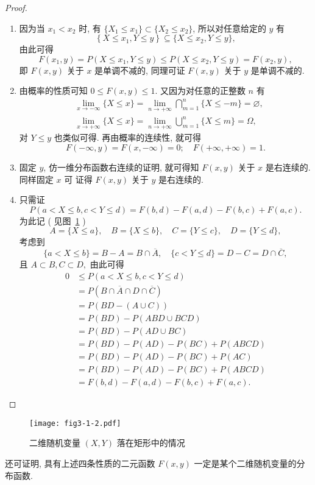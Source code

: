   \begin{proof}
    	\begin{enumerate}
    		\item  因为当 $x_1<x_2$ 时, 有 $\{X_1\leq x_1\} \subset \{X_2 \leq x_2\}$, 所以对任意给定的 $y$ 有
    		\[
    			\left\{X \leq x_{1}, Y \leq y\right\} \subseteq \{ X \leq x_{2}, Y \leq y \},
    		\]
    		由此可得
    		\[
    			F\left(x_{1}, y\right)=P\left(X \leq x_{1}, Y \leq y\right) \leq 
    			P\left(X \leq x_{2}, Y \leq y\right)=F\left(x_{2}, y\right),
    		\]
    		即 $F(x,y)$ 关于 $x$ 是单调不减的, 同理可证 $F(x,y)$ 关于 $y$ 是单调不减的.
    		\item 由概率的性质可知 $0\leq F(x,y) \leq 1$. 又因为对任意的正整数 $n$ 有
    		\begin{align*}
    			&\lim_{x\to -\infty}\{X\leq x\}=\lim_{n\to +\infty}\bigcap_{m=1}^n \{X\leq -m\}=\varnothing,	\\
    			&\lim_{x\to +\infty}\{X\leq x\}=\lim_{n\to +\infty}\bigcup_{m=1}^n\{X\leq m\}=\Omega,
    		\end{align*}
    		对 $Y \leq y$ 也类似可得. 再由概率的连续性, 就可得
    		\[
    		 	F(-\infty, y)=F(x,-\infty)=0; \quad F(+\infty,+\infty)=1.
    		\]
    		\item 固定 $y$, 仿一维分布函数右连续的证明, 就可得知 $F(x, y)$ 关于 $x$ 是右连续的. 同样固定 $x$ 可
    		证得 $F(x,y)$ 关于 $y$ 是右连续的.
        	\item 只需证
        	\[
        	 	P(a<X \leq b, c<Y \leq d)=F(b, d)-F(a, d)-F(b, c)+F(a, c).
        	\]
        	为此记 ( 见图~\ref{fig:3.1.2} )
        	\[
        	 	A=\{X \leqslant a\}, \quad B=\{ X \leqslant b \}, \quad C=\{Y \leqslant c\}, \quad D=\{Y \leqslant d\},
        	\]
        	考虑到
        	\[
        	 	\{ a<X \leqslant b \}=B-A=B \cap \overline{A}, \quad\{c<Y \leqslant d\}=D-C=D \cap \overline{C},
        	\]
        	且 $A \subset B, C\subset D,$ 由此可得
        	\begin{align*}
        		 0 & \leqslant P(a<X \leqslant b, c<Y \leqslant d) \\
        		 &=P(B \cap \overline{A} \cap D \cap \overline{C}) \\
        		 &=P(B D-(A \cup C)) \\
        		 &=P(B D)-P(A B D \cup B C D) \\
        		 &=P(B D)-P(A D \cup B C) \\
        		 &=P(B D)-P(A D)-P(B C)+P(A B C D) \\
        		 &=P(B D)-P(A D)-P(B C)+P(A C ) \\
        		 &=P(B D)-P(A D)-P(B C)+P(A B C D) \\
        		 &=F(b, d)-F(a, d)-F(b, c)+F(a, c). 
        	\end{align*}
    	\end{enumerate}
    \end{proof}
   \begin{figure}[htbp]
   	\centering
   	\texttt{[image: fig3-1-2.pdf]}
   	\caption{二维随机变量 $(X,Y)$ 落在矩形中的情况}\label{fig:3.1.2}
   \end{figure}
   还可证明, 具有上述四条性质的二元函数 $F(x,y)$ 一定是某个二维随机变量的分布函数.

